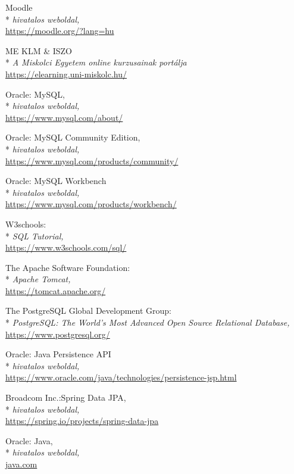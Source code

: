 \begin{thebibliography}{x}
 Moodle\\*
\textit{hivatalos weboldal,}
\\ \url{https://moodle.org/?lang=hu}

 ME KLM \& ISZO\\*
\textit{A Miskolci Egyetem online kurzusainak portálja}
\\ \url{https://elearning.uni-miskolc.hu/}

 Oracle: MySQL,\\*
\textit{hivatalos weboldal,}
\\ \url{https://www.mysql.com/about/}

 Oracle: MySQL Community Edition,\\*
\textit{hivatalos weboldal,}
\\ \url{https://www.mysql.com/products/community/}

 Oracle: MySQL Workbench\\*
\textit{hivatalos weboldal,}
\\ \url{https://www.mysql.com/products/workbench/}

 W3schools:\\*
\textit{SQL Tutorial,}
\\ \url{https://www.w3schools.com/sql/}

 The Apache Software Foundation: \\*
\textit{Apache Tomcat,}
\\ \url{https://tomcat.apache.org/}

 The PostgreSQL Global Development Group:\\*
\textit{PostgreSQL: The World's Most Advanced Open Source Relational Database,}
\\ \url{https://www.postgresql.org/}

 Oracle: Java Persistence API\\*
\textit{hivatalos weboldal,}
\\ \url{https://www.oracle.com/java/technologies/persistence-jsp.html}

 Broadcom Inc.:Spring Data JPA,\\*
\textit{hivatalos weboldal,}
\\ \url{https://spring.io/projects/spring-data-jpa}

 Oracle: Java,\\*
\textit{hivatalos weboldal,}
\\ \url{java.com}


\end{thebibliography}
